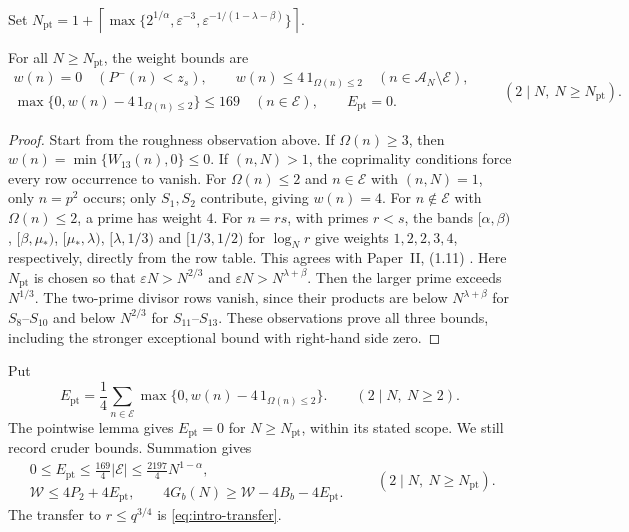 Set
$N_{\mathrm{pt}}=1+\left\lceil\max\{2^{1/\alpha},
\varepsilon^{-3},\varepsilon^{-1/(1-\lambda-\beta)}\}\right\rceil$.
\begin{lemma}
\label{lem:source-pointwise}
For all $N\ge N_{\mathrm{pt}}$, the weight bounds are
\begin{equation}\label{eq:source-pointwise}
\begin{gathered}
 w(n)=0\quad(P^-(n)<z_s),\qquad
 w(n)\le4\,1_{\Omega(n)\le2}\quad(n\in\mathcal A_N\setminus\mathcal E),\\
 \max\{0,w(n)-4\,1_{\Omega(n)\le2}\}\le169
 \quad(n\in\mathcal E),
 \qquad E_{\mathrm{pt}}=0.
\end{gathered}
\qquad(2\mid N,\ N\ge N_{\mathrm{pt}}).
\end{equation}
\begin{proof}
Start from the roughness observation above.
If $\Omega(n)\ge3$, then $w(n)=\min\{W_{13}(n),0\}\le0$.
If $(n,N)>1$, the coprimality conditions force every row occurrence to vanish.
For $\Omega(n)\le2$ and $n\in\mathcal E$ with $(n,N)=1$,
only $n=p^2$ occurs; only $S_1,S_2$ contribute, giving $w(n)=4$.
For $n\notin\mathcal E$ with $\Omega(n)\le2$, a prime has weight $4$.
For $n=rs$, with primes $r<s$, the bands
$[\alpha,\beta)$, $[\beta,\mu_*)$, $[\mu_*,\lambda)$,
$[\lambda,1/3)$ and $[1/3,1/2)$ for $\log_Nr$
give weights $1,2,2,3,4$, respectively, directly from the row table.
This agrees with Paper~II, (1.11) \cite[(1.10)--(1.11)]{PaperII}.
Here $N_{\mathrm{pt}}$ is chosen so that
$\varepsilon N>N^{2/3}$ and
$\varepsilon N>N^{\lambda+\beta}$.
Then the larger prime exceeds $N^{1/3}$. The two-prime divisor
rows vanish, since their products are below $N^{\lambda+\beta}$ for
$S_8$--$S_{10}$ and below $N^{2/3}$ for $S_{11}$--$S_{13}$.
These observations prove all three bounds, including the stronger
exceptional bound with right-hand side zero.
\end{proof}
\end{lemma}
Put
\begin{equation}\label{eq:source-pointwise-error}
 E_{\mathrm{pt}}=\frac14\sum_{n\in\mathcal E}
       \max\{0,w(n)-4\,1_{\Omega(n)\le2}\}.
\qquad(2\mid N,\ N\ge2).
\end{equation}
The pointwise lemma gives $E_{\mathrm{pt}}=0$ for
$N\ge N_{\mathrm{pt}}$, within its stated scope.
We still record cruder bounds. Summation gives
\begin{equation}\label{eq:source-first-lower}
\begin{gathered}
 0\le E_{\mathrm{pt}}\le\frac{169}{4}|\mathcal E|
       \le\frac{2197}{4}N^{1-\alpha},\\
 \mathcal W\le4P_2+4E_{\mathrm{pt}},\qquad
 4G_b(N)\ge\mathcal W-4B_b-4E_{\mathrm{pt}}.
\end{gathered}
\qquad(2\mid N,\ N\ge N_{\mathrm{pt}}).
\end{equation}
The transfer to \(r\le q^{3/4}\) is \eqref{eq:intro-transfer}.

